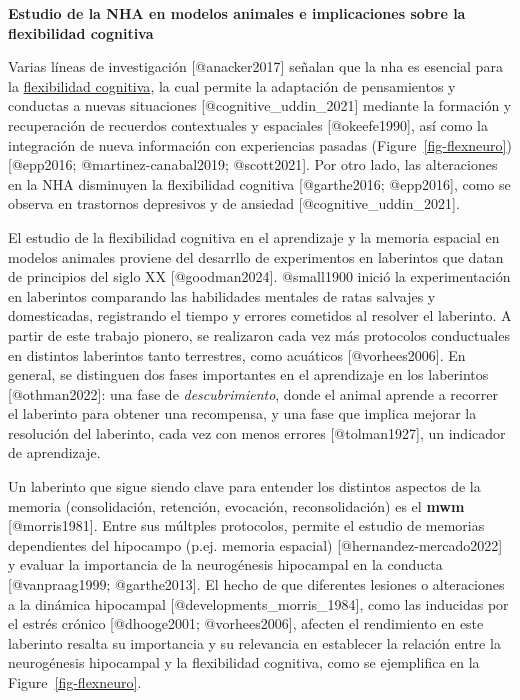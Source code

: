 \documentclass[
  11pt]{../MastersDoctoralThesisUNAM}
\begin{document}
\begin{tcolorbox}[enhanced jigsaw, colframe=quarto-callout-important-color-frame, left=2mm, bottomrule=.15mm, rightrule=.15mm, arc=.35mm, toprule=.15mm, leftrule=.75mm, breakable, opacityback=0, colback=white]

\vspace{-3mm}\textbf{\textbf{Estudio de la NHA en modelos animales e implicaciones sobre la
flexibilidad cognitiva}}\vspace{3mm}

Varias líneas de investigación {[}@anacker2017{]} señalan que la
\ac{nha} es esencial para la
\href{@AppendixB.qmd\#term-id-19}{flexibilidad cognitiva}, la cual
permite la adaptación de pensamientos y conductas a nuevas situaciones
{[}@cognitive\_uddin\_2021{]} mediante la formación y recuperación de
recuerdos contextuales y espaciales {[}@okeefe1990{]}, así como la
integración de nueva información con experiencias pasadas
(Figure~\ref{fig-flexneuro}) {[}@epp2016; @martinez-canabal2019;
@scott2021{]}. Por otro lado, las alteraciones en la NHA disminuyen la
flexibilidad cognitiva {[}@garthe2016; @epp2016{]}, como se observa en
trastornos depresivos y de ansiedad {[}@cognitive\_uddin\_2021{]}.

El estudio de la flexibilidad cognitiva en el aprendizaje y la memoria
espacial en modelos animales proviene del desarrllo de experimentos en
laberintos que datan de principios del siglo XX {[}@goodman2024{]}.
@small1900 inició la experimentación en laberintos comparando las
habilidades mentales de ratas salvajes y domesticadas, registrando el
tiempo y errores cometidos al resolver el laberinto. A partir de este
trabajo pionero, se realizaron cada vez más protocolos conductuales en
distintos laberintos tanto terrestres, como acuáticos
{[}@vorhees2006{]}. En general, se distinguen dos fases importantes en
el aprendizaje en los laberintos {[}@othman2022{]}: una fase de
\emph{descubrimiento}, donde el animal aprende a recorrer el laberinto
para obtener una recompensa, y una fase que implica mejorar la
resolución del laberinto, cada vez con menos errores {[}@tolman1927{]},
un indicador de aprendizaje.

Un laberinto que sigue siendo clave para entender los distintos aspectos
de la memoria (consolidación, retención, evocación, reconsolidación) es
el \textbf{\ac{mwm}} {[}@morris1981{]}. Entre sus múltples protocolos,
permite el estudio de memorias dependientes del hipocampo (p.ej. memoria
espacial) {[}@hernandez-mercado2022{]} y evaluar la importancia de la
neurogénesis hipocampal en la conducta {[}@vanpraag1999;
@garthe2013{]}. El hecho de que diferentes lesiones
\colorbox{BurntOrange}{o alteraciones a la dinámica hipocampal}
{[}@developments\_morris\_1984{]}, como las inducidas por el estrés
crónico {[}@dhooge2001; @vorhees2006{]}, afecten el rendimiento en este
laberinto resalta su importancia y su relevancia en establecer la
relación entre la neurogénesis hipocampal y la flexibilidad cognitiva,
como se ejemplifica en la Figure~\ref{fig-flexneuro}.


\end{tcolorbox}
\end{document}
